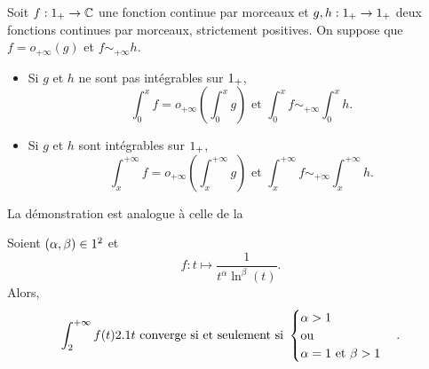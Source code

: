 \begin{prop}
    Soit $f: 1_+ \rightarrow \mathbb{C}$ une fonction continue par morceaux et $g, h:1_+ \rightarrow 1_+$ deux fonctions continues par morceaux, strictement positives. On suppose que $f = o_{+\infty}(g)$ et $f \sim_{+\infty} h$.\\
    \begin{itemize}
        \item Si $g$ et $h$ ne sont pas intégrables sur $1_+$,
        $$\int_{0}^{x} f = o_{+\infty} \left(\int_{0}^{x} g \right) \text{ et } \int_{0}^{x} f \sim_{+\infty} \int_{0}^{x} h.$$
        \item Si $g$ et $h$ sont intégrables sur $1_+$,
        $$\int_{x}^{+\infty} f = o_{+\infty} \left(\int_{x}^{+\infty} g \right) \text{ et } \int_{x}^{+\infty} f \sim_{+\infty} \int_{x}^{+\infty} h.$$
    \end{itemize}
\end{prop} 

La démonstration est analogue à celle de la 



\begin{theo}
    Soient $(\alpha, \beta) \in  1^2$ et 
    $$f:t \mapsto \frac{1}{t^{\alpha} \ln^{\beta} (t)}.$$
    Alors,
    $$\int_{2}^{+ \infty} f(t) 2.1 t \text{ converge si et seulement si }
    \begin{cases}
    \alpha > 1 \\
    \text{ou}\\
    \alpha = 1 \text{ et } \beta > 1
    \end{cases}.
    $$
\end{theo}



